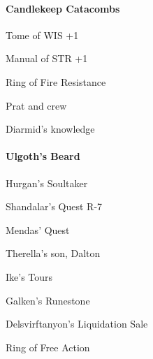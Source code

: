 \documentclass[10pt,a4,twoside]{book}
\begin{document}
\begin{multicols}{3}
\paragraph*{Candlekeep Catacombs}
\begin{trivlist}
\item Tome of WIS +1
\item Manual of STR +1
\item Ring of Fire Resistance

\item Prat and crew
\item Diarmid's knowledge
\end{trivlist}



\paragraph*{Ulgoth's Beard}
\begin{trivlist}
\item Hurgan's Soultaker  \label{hurgan} %
\item Shandalar's Quest \textcolor{Mahogany}{R-7}
\item Mendas' Quest
\item Therella's son, Dalton  \label{therella} %
\item Ike's Tours  \label{ike} %
\item Galken's Runestone  \label{galken} %
\item Delsvirftanyon's Liquidation Sale  \label{sale} %
\item Ring of Free Action
\end{trivlist}


\end{multicols}
\end{document}

